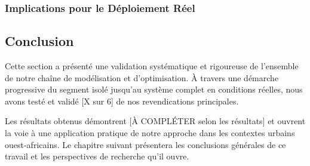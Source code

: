 
\subsubsection{Implications pour le Déploiement Réel}
\label{subsec:implications_deploiement}



\subsection{Conclusion}
\label{sec:conclusion_validation}

Cette section a présenté une validation systématique et rigoureuse de l'ensemble de notre chaîne de modélisation et d'optimisation. À travers une démarche progressive du segment isolé jusqu'au système complet en conditions réelles, nous avons testé et validé [X sur 6] de nos revendications principales.


Les résultats obtenus démontrent [À COMPLÉTER selon les résultats] et ouvrent la voie à une application pratique de notre approche dans les contextes urbains ouest-africains. Le chapitre suivant présentera les conclusions générales de ce travail et les perspectives de recherche qu'il ouvre.
